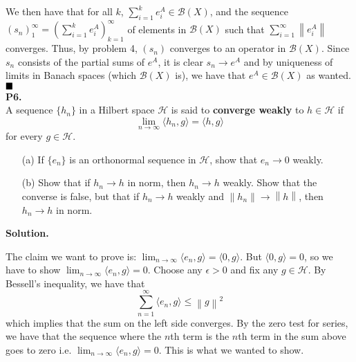 \documentclass{article}
\newcommand{\norm}[1]{\left\lVert#1\right\rVert}
\begin{document}
    We then have that for all $k$, 
    $\sum_{i=1}^k e^A_i\in\mathcal{B}(X)$, and the sequence $(s_n)_1^{\infty} = (\sum_{i=1}^k e^A_i)_{k=1}^{\infty}$ of elements
    in $\mathcal{B}(X)$ such that $\sum_{i=1}^{\infty} \norm{e^A_i}$ converges. Thus, by problem 4, $(s_n)$ converges to an operator
    in $\mathcal{B}(X)$. Since $s_n$ consists of the partial sums of $e^A$, it is clear $s_n \to e^A$ and by uniqueness of limits
    in Banach spaces (which $\mathcal{B}(X)$ is), we have that $e^A\in\mathcal{B}(X)$ as wanted.$\hfill\blacksquare$\\

    \textbf{P6.}\\

    A sequence $\{h_n\}$ in a Hilbert space $\mathcal{H}$ is said to \textbf{converge weakly} to $h\in\mathcal{H}$ if
    \[ \lim_{n\to\infty} \langle h_n,g\rangle = \langle h,g\rangle \]
    for every $g\in\mathcal{H}$.
    \begin{enumerate}
        \item[(a)] If $\{e_n\}$ is an orthonormal sequence in $\mathcal{H}$, show that $e_n\to 0$ weakly.
        \item[(b)] Show that if $h_n\to h$ in norm, then $h_n\to h$ weakly. Show that the converse is false, but that if
            $h_n\to h$ weakly and $\norm{h_n}\to\norm{h}$, then $h_n\to h$ in norm.
    \end{enumerate}

    \textbf{Solution.}

    The claim we want to prove is: $\lim_{n\to\infty} \langle e_n,g\rangle = \langle 0,g\rangle$. But $\langle 0,g\rangle = 0$,
    so we have to show $\lim_{n\to\infty} \langle e_n,g\rangle = 0$. Choose any $\epsilon>0$ and fix any $g\in\mathcal{H}$.
    By Bessell's inequality, we have that
    \[ \sum_{n=1}^{\infty} \langle e_n,g\rangle \leq \norm{g}^2 \]
    which implies that the sum on the left side converges. By the zero test for series, we have that the sequence where the $n$th
    term is the $n$th term in the sum above goes to zero i.e. $\lim_{n\to\infty} \langle e_n,g\rangle = 0$. This is what we wanted
    to show.\\
\end{document}
